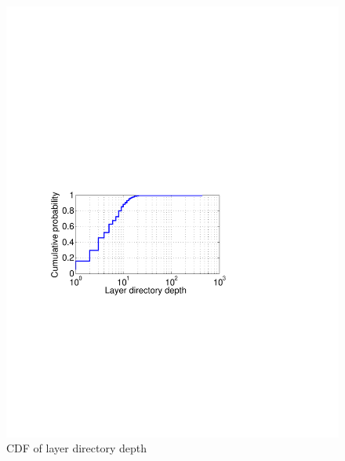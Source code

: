 \begin{figure}[t]
\begin{minipage}{0.22\textwidth}
		\includegraphics[width=1\textwidth]{graphs/layer-depth-cdf.pdf}
		\caption{CDF of layer directory depth}
		\label{fig:layer-depth-cdf}
	\end{minipage}
\end{figure}
